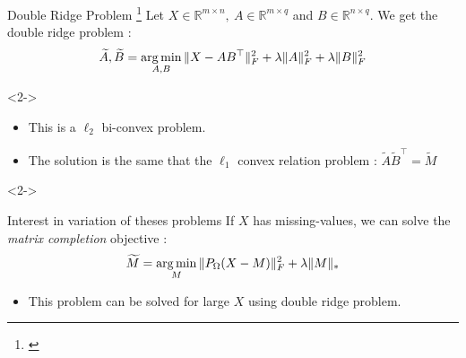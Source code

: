 \documentclass[10pt,aspectratio=43]{beamer}
\begin{document}
\begin{frame}{Double Ridge Problem \footnote[frame]{\citet{srebro2005maximum}}}{}
    Let $X \in \mathbb{R}^{m\times n },~  A \in \mathbb{R}^{m\times q}$ and $B \in \mathbb{R}^{n \times q }$. We get the double ridge problem :
    $$ \widetilde{A}, \widetilde{B} =  \mathop{\mathrm{arg\,min}}_{A, B} \|X-AB^\top \|_F^2 + \lambda \|A \|_F^2 +\lambda \|B \|_F^2 $$
    \begin{onlyenv}<2->
        \begin{itemize}
            \item This is a $\ell_2$ bi-convex problem.
            \item The solution is the same that  the $\ell_1$ convex relation problem  :
            $ \widetilde{A} \widetilde{B}^\top = \widetilde{M} $
        \end{itemize}
    \end{onlyenv}
    \begin{onlyenv}<2->
        \begin{block}{Interest in variation of theses  problems}
            If $X$ has missing-values, we can solve the \textit{matrix completion} objective :
            $$\widetilde{M} = \mathop{\mathrm{arg\,min}}_{M} \|P_\Omega (X-M)\|_F^2 + \lambda \|M\|_*$$
        \end{block}
        \begin{itemize}
            \item This problem can be solved for large $X$ using double ridge problem.
        \end{itemize}
    \end{onlyenv}
\end{frame}




\begin{frame}
    
\end{frame}
\end{document}

